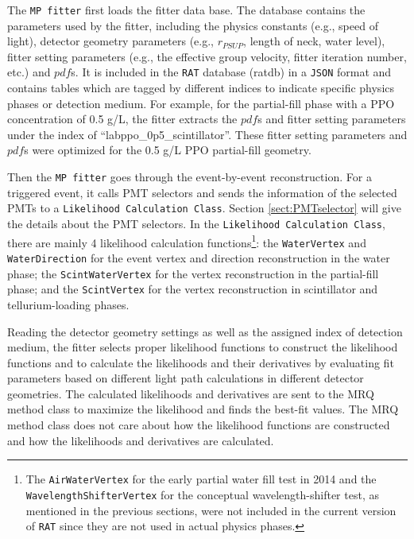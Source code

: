 The \texttt{MP fitter} first loads the fitter data base. The database contains the parameters used by the fitter, including the physics constants (e.g., speed of light), detector geometry parameters (e.g., $r_{PSUP}$, length of neck, water level), fitter setting parameters (e.g., the effective group velocity, fitter iteration number, etc.) and $pdf$s. It is included in the \texttt{RAT} database (ratdb) in a \texttt{JSON} format\cite{JSONwiki} and contains tables which are tagged by different indices to indicate specific physics phases or detection medium. For example, for the partial-fill phase with a PPO concentration of 0.5 g/L, the fitter extracts the $pdf$s and fitter setting parameters under the index of ``labppo\_0p5\_scintillator''. These fitter setting parameters and $pdf$s were optimized for the 0.5 g/L PPO partial-fill geometry.

Then the \texttt{MP fitter} goes through the event-by-event reconstruction. For a triggered event, it calls PMT selectors and sends the information of the selected PMTs to a \texttt{Likelihood Calculation Class}. Section \ref{sect:PMTselector} will give the details about the PMT selectors. In the \texttt{Likelihood Calculation Class}, there are mainly 4 likelihood calculation functions\footnote{The \texttt{AirWaterVertex} for the early partial water fill test in 2014 and the \texttt{WavelengthShifterVertex} for the conceptual wavelength-shifter test, as mentioned in the previous sections, were not included in the current version of \texttt{RAT} since they are not used in actual physics phases.}: the \texttt{WaterVertex} and \texttt{WaterDirection} for the event vertex and direction reconstruction in the water phase; the \texttt{ScintWaterVertex} for the vertex reconstruction in the partial-fill phase; and the \texttt{ScintVertex} for the vertex reconstruction in scintillator and tellurium-loading phases.

Reading the detector geometry settings as well as the assigned index of detection medium, the fitter selects proper likelihood functions to construct the likelihood functions and to calculate the likelihoods and their derivatives by evaluating fit parameters based on different light path calculations in different detector geometries. The calculated likelihoods and derivatives are sent to the MRQ method class to maximize the likelihood and finds the best-fit values. The MRQ method class does not care about how the likelihood functions are constructed and how the likelihoods and derivatives are calculated. 
	
